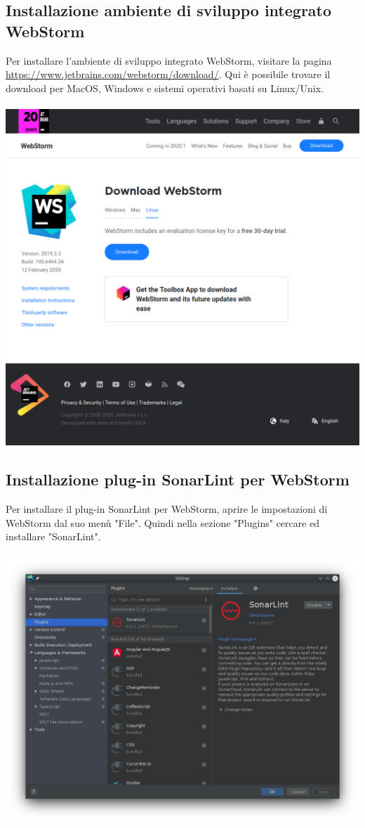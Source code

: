 \subsection{Installazione ambiente di sviluppo integrato WebStorm}
Per installare l'ambiente di sviluppo integrato WebStorm, visitare la pagina \url{https://www.jetbrains.com/webstorm/download/}. Qui è possibile trovare il download per MacOS, Windows e sistemi operativi basati su Linux/Unix.
\\
\\
\includegraphics[width=\textwidth,height=\textheight,keepaspectratio]{img/webstorm.png}

\pagebreak
\subsection{Installazione plug-in SonarLint per WebStorm}
Per installare il plug-in SonarLint per WebStorm, aprire le impostazioni di WebStorm dal suo menù "File". Quindi nella sezione "Plugins" cercare ed installare "SonarLint".
\\
\\
\includegraphics[width=\textwidth,height=\textheight,keepaspectratio]{img/sonarlint.png}

